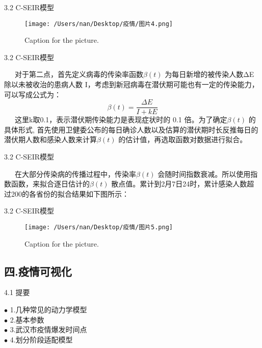 \documentclass[
  ignorenonframetext,
]{beamer}
\begin{document}
\begin{frame}{3.2 C-SEIR模型}
\protect\hypertarget{c-seir-1}{}

\begin{figure}
\centering
\texttt{[image: /Users/nan/Desktop/疫情/图片4.png]}
\caption{Caption for the picture.}
\end{figure}

\end{frame}

\begin{frame}{3.2 C-SEIR模型}
\protect\hypertarget{c-seir-2}{}

  对于第二点，首先定义病毒的传染率函数\(\beta(t)\)
为每日新增的被传染人数ΔE 除以未被收治的患病人数
I，考虑到新冠病毒在潜伏期可能也有一定的传染能力，可以写成公式为：\\
\[ \beta (t) = \frac {\Delta E}{I + k E} \]
  这里k取0.1，表示潜伏期传染能力是表现症状时的 0.1
倍。为了确定\(\beta(t)\) 的具体形式,
首先使用卫健委公布的每日确诊人数以及估算的潜伏期时长反推每日的潜伏期人数和感染人数来计算\(\beta(t)\)
的估计值，再选取函数对数据进行拟合。

\end{frame}

\begin{frame}{3.2 C-SEIR模型}
\protect\hypertarget{c-seir-3}{}

  在大部分传染病的传播过程中，传染率\(\beta(t)\)
会随时间指数衰减。所以使用指数函数，来拟合逐日估计的\(\beta(t)\)
散点值。累计到2月7日24时，累计感染人数超过200的各省份的拟合结果如下图所示：

\end{frame}

\begin{frame}{3.2 C-SEIR模型}
\protect\hypertarget{c-seir-4}{}

\begin{figure}
\centering
\texttt{[image: /Users/nan/Desktop/疫情/图片5.png]}
\caption{Caption for the picture.}
\end{figure}

\end{frame}

\hypertarget{section-12}{%
\subsection{四.疫情可视化}\label{section-12}}

\begin{frame}{4.1 提要}
\protect\hypertarget{section-13}{}

\(\bullet\) 1.几种常见的动力学模型\\
\(\bullet\) 2.基本参数\\
\(\bullet\) 3.武汉市疫情爆发时间点\\
\(\bullet\) 4.划分阶段适配模型

\end{frame}
\end{document}
